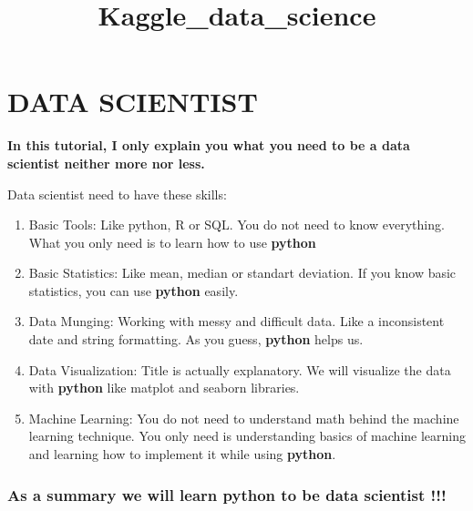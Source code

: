 \documentclass[11pt]{article}
\title{Kaggle\_data\_science}
\providecommand{\tightlist}{%
      \setlength{\itemsep}{0pt}\setlength{\parskip}{0pt}}
\begin{document}
    
    
    \maketitle
    
    

    
    \hypertarget{data-scientist}{%
\section{DATA SCIENTIST}\label{data-scientist}}

\textbf{In this tutorial, I only explain you what you need to be a data
scientist neither more nor less.}

Data scientist need to have these skills:

\begin{enumerate}
\def\labelenumi{\arabic{enumi}.}
\tightlist
\item
  Basic Tools: Like python, R or SQL. You do not need to know
  everything. What you only need is to learn how to use \textbf{python}
\item
  Basic Statistics: Like mean, median or standart deviation. If you know
  basic statistics, you can use \textbf{python} easily.
\item
  Data Munging: Working with messy and difficult data. Like a
  inconsistent date and string formatting. As you guess, \textbf{python}
  helps us.
\item
  Data Visualization: Title is actually explanatory. We will visualize
  the data with \textbf{python} like matplot and seaborn libraries.
\item
  Machine Learning: You do not need to understand math behind the
  machine learning technique. You only need is understanding basics of
  machine learning and learning how to implement it while using
  \textbf{python}.
\end{enumerate}

\hypertarget{as-a-summary-we-will-learn-python-to-be-data-scientist}{%
\subsubsection{As a summary we will learn python to be data scientist
!!!}\label{as-a-summary-we-will-learn-python-to-be-data-scientist}}
\end{document}
